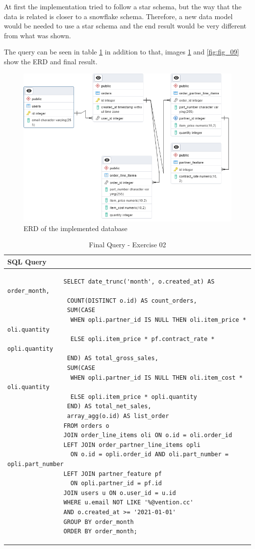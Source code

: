 \documentclass[]{report}
\begin{document}
At first the implementation tried to follow a star schema, but the way that the data is related is closer to a snowflake schema. Therefore, a new data model would be needed to use a star schema and the end result would be very different from what was shown.

The query can be seen in table \textcolor{blue}{\ref{tbl:sql_query}} in addition to that, images \textcolor{blue}{\ref{fig:fig_08}} and \textcolor{blue}{\ref{fig:fig_09}} show the ERD and final result.

\begin{figure}[htb]
	\centering
	\includegraphics[width=1.1\textwidth]{01_data_modeling_resize}
	\caption{ERD of the implemented database}
	\label{fig:fig_08}
\end{figure}

\begin{table}[h]
	\centering
	\begin{tabular}{l}
		\hline
		\textbf{SQL Query} \\
		\hline
		\begin{minipage}[t]{0.9\textwidth}
			\begin{verbatim}
				SELECT date_trunc('month', o.created_at) AS order_month,
				 COUNT(DISTINCT o.id) AS count_orders,
				 SUM(CASE
				  WHEN opli.partner_id IS NULL THEN oli.item_price * oli.quantity
				  ELSE opli.item_price * pf.contract_rate * opli.quantity
				 END) AS total_gross_sales,
				 SUM(CASE
				  WHEN opli.partner_id IS NULL THEN oli.item_cost * oli.quantity
				  ELSE opli.item_price * opli.quantity
				 END) AS total_net_sales,
				 array_agg(o.id) AS list_order
				FROM orders o
				JOIN order_line_items oli ON o.id = oli.order_id
				LEFT JOIN order_partner_line_items opli 
				  ON o.id = opli.order_id AND oli.part_number = opli.part_number
				LEFT JOIN partner_feature pf 
				  ON opli.partner_id = pf.id
				JOIN users u ON o.user_id = u.id
				WHERE u.email NOT LIKE '%@vention.cc'
				AND o.created_at >= '2021-01-01'
				GROUP BY order_month
				ORDER BY order_month;
			\end{verbatim}
		\end{minipage} \\
		\hline
	\end{tabular}
	\caption{Final Query - Exercise 02}
	\label{tbl:sql_query}
\end{table}
\end{document}

